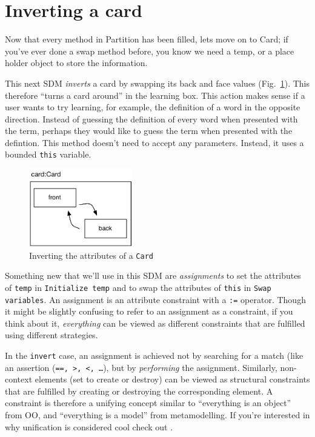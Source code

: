 \newpage
\section{Inverting a card}
\genHeader
\hypertarget{sec:invertCard}{}

Now that every method in Partition has been filled, lets move on to Card; if you've ever done a swap method before, you know we need a temp, or a place holder
object to store the information.

This next SDM \emph{inverts} a card by swapping its back and face values (Fig.~\ref{fig:goal_invert}). This therefore ``turns a card around'' in the learning
box. This action makes sense if a user wants to try learning, for example, the definition of a word in the opposite direction. Instead of guessing the
definition of every word when presented with the term, perhaps they would like to guess the term when presented with the defintion. This method doesn't need to
accept any parameters. Instead, it uses a bounded \texttt{this} variable.

\vspace{0.5cm}

\begin{figure}[htbp]
	\centering
    \includegraphics[width=0.4\textwidth]{goal_invert.pdf}
 	\caption{Inverting the attributes of a \texttt{Card}}
 	\label{fig:goal_invert}
\end{figure}
\FloatBarrier

Something new that we'll use in this SDM are \emph{assignments} to set the attributes of \texttt{temp} in \texttt{Initialize temp} and to swap
the attributes of \texttt{this} in \texttt{Swap variables}. An assignment is an attribute constraint with a \texttt{:=} operator. Though it might be slightly
confusing to refer to an assignment as a constraint, if you think about it, \emph{everything} can be viewed as different constraints that are fulfilled using
different strategies. 

In the \texttt{invert} case, an assignment is achieved not by searching for a match (like an assertion (\texttt{==, >, <, \ldots}), but
by \emph{performing} the assignment. Similarly, non-context elements (set to create or destroy) can be viewed as structural constraints that are fulfilled by
creating or destroying the corresponding element.  A constraint is therefore a unifying concept similar to ``everything is an object'' from OO, and ``everything
is a model'' from metamodelling.  If  you're interested in why unification is considered cool check out \cite{BEZ05}.

